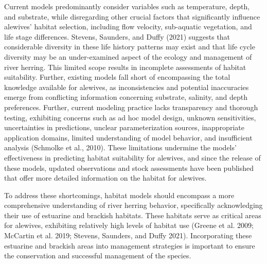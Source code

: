 \documentclass[
]{book}
\begin{document}
Current models predominantly consider variables such as temperature, depth, and substrate, while disregarding other crucial factors that significantly influence alewives' habitat selection, including flow velocity, sub-aquatic vegetation, and life stage differences. Stevens, Saunders, and Duffy (2021) suggests that considerable diversity in these life history patterns may exist and that life cycle diversity may be an under-examined aspect of the ecology and management of river herring. This limited scope results in incomplete assessments of habitat suitability. Further, existing models fall short of encompassing the total knowledge available for alewives, as inconsistencies and potential inaccuracies emerge from conflicting information concerning substrate, salinity, and depth preferences. Further, current modeling practice lacks transparency and thorough testing, exhibiting concerns such as ad hoc model design, unknown sensitivities, uncertainties in predictions, unclear parameterization sources, inappropriate application domains, limited understanding of model behavior, and insufficient analysis (Schmolke et al., 2010). These limitations undermine the models' effectiveness in predicting habitat suitability for alewives, and since the release of these models, updated observations and stock assessments have been published that offer more detailed information on the habitat for alewives.

To address these shortcomings, habitat models should encompass a more comprehensive understanding of river herring behavior, specifically acknowledging their use of estuarine and brackish habitats. These habitats serve as critical areas for alewives, exhibiting relatively high levels of habitat use (Greene et al. 2009; McCartin et al. 2019; Stevens, Saunders, and Duffy 2021). Incorporating these estuarine and brackish areas into management strategies is important to ensure the conservation and successful management of the species.
\end{document}
